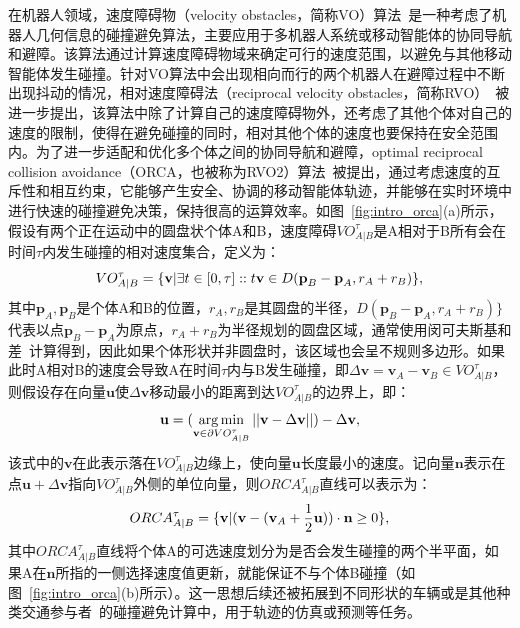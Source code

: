 在机器人领域，速度障碍物（velocity obstacles，简称VO）算法~\cite{fiorini1998motion}是一种考虑了机器人几何信息的碰撞避免算法，主要应用于多机器人系统或移动智能体的协同导航和避障。该算法通过计算速度障碍物域来确定可行的速度范围，以避免与其他移动智能体发生碰撞。针对VO算法中会出现相向而行的两个机器人在避障过程中不断出现抖动的情况，相对速度障碍法（reciprocal velocity obstacles，简称RVO）~\cite{van2008reciprocal}被进一步提出，该算法中除了计算自己的速度障碍物外，还考虑了其他个体对自己的速度的限制，使得在避免碰撞的同时，相对其他个体的速度也要保持在安全范围内。为了进一步适配和优化多个体之间的协同导航和避障，optimal reciprocal collision avoidance（ORCA，也被称为RVO2）算法~\cite{van2011reciprocal}被提出，通过考虑速度的互斥性和相互约束，它能够产生安全、协调的移动智能体轨迹，并能够在实时环境中进行快速的碰撞避免决策，保持很高的运算效率。如图~\ref{fig:intro_orca}(a)所示，假设有两个正在运动中的圆盘状个体A和B，速度障碍$VO^{\tau}_{A|B}$是A相对于B所有会在时间$\tau$内发生碰撞的相对速度集合，定义为：
\begin{equation}
\setlength\abovedisplayskip{10pt}
\setlength\belowdisplayskip{10pt}
\label{eq:intro_orca1}
    VO^{\tau}_{A|B} = \{ \textbf{v} | \exists t \in [0, \tau] :: t\textbf{v} \in D(\textbf{p}_B - \textbf{p}_A, r_A + r_B) \},
\end{equation}
其中$\textbf{p}_A, \textbf{p}_B$是个体A和B的位置，$r_A, r_B$是其圆盘的半径，$D(\textbf{p}_B - \textbf{p}_A, r_A + r_B) \}$代表以点$\textbf{p}_B - \textbf{p}_A$为原点，$r_A+r_B$为半径规划的圆盘区域，通常使用闵可夫斯基和差~\cite{hadwiger1950minkowskische}计算得到，因此如果个体形状并非圆盘时，该区域也会呈不规则多边形。如果此时A相对B的速度会导致A在时间$\tau$内与B发生碰撞，即$\Delta\textbf{v}=\textbf{v}_A - \textbf{v}_B \in VO^{\tau}_{A|B}$，则假设存在向量$\textbf{u}$使$\Delta\textbf{v}$移动最小的距离到达$VO^{\tau}_{A|B}$的边界上，即：
\begin{equation}
\setlength\abovedisplayskip{10pt}
\setlength\belowdisplayskip{10pt}
\label{eq:intro_orca2}
    \textbf{u} = (\mathop{\arg\min}\limits_{ \textbf{v} \in \partial VO^{\tau}_{A|B}} || \textbf{v} - \Delta\textbf{v} || ) - \Delta\textbf{v},
\end{equation}
该式中的$\textbf{v}$在此表示落在$VO^{\tau}_{A|B}$边缘上，使向量$\textbf{u}$长度最小的速度。记向量$\textbf{n}$表示在点$\textbf{u} + \Delta\textbf{v}$指向$VO^{\tau}_{A|B}$外侧的单位向量，则$ORCA^{\tau}_{A|B}$直线可以表示为：
\begin{equation}
\setlength\abovedisplayskip{10pt}
\setlength\belowdisplayskip{10pt}
\label{eq:intro_orca3}
    ORCA^{\tau}_{A|B} = \{ \textbf{v} | (\textbf{v} - (\textbf{v}_A + \frac{1}{2}\textbf{u}))\cdot\textbf{n} \geq 0 \},
\end{equation}
其中$ORCA^{\tau}_{A|B}$直线将个体A的可选速度划分为是否会发生碰撞的两个半平面，如果A在$\textbf{n}$所指的一侧选择速度值更新，就能保证不与个体B碰撞（如图~\ref{fig:intro_orca}(b)所示）。这一思想后续还被拓展到不同形状的车辆或是其他种类交通参与者~\cite{ma2018efficient, luo2022gamma}的碰撞避免计算中，用于轨迹的仿真或预测等任务。




